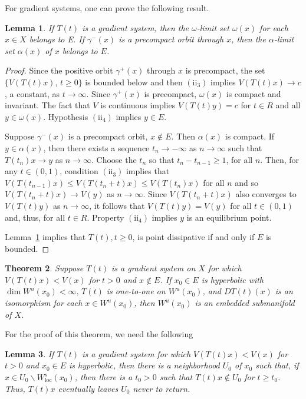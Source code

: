 \documentclass{surv-l}
\theoremstyle{plain}
\newtheorem{theorem}{Theorem}[section]
\newtheorem{lemma}[theorem]{Lemma}
\theoremstyle{definition}
\numberwithin{equation}{section}
\numberwithin{figure}{chapter}
\begin{document}
For gradient systems, one can prove the following result.

\begin{lemma}\label{lem3.8.2} If $T(t)$ is a gradient system, then the $\omega$-limit set $\omega(x)$ for each $x\in X$ belongs to E. If $\gamma^{-}(x)$ is a precompact orbit through $x$, then the $\alpha$-limit set $\alpha(x)$ of $x$ belongs to $E$.
\end{lemma}

\begin{proof} Since the positive orbit $\gamma^{+}(x)$ through $x$ is precompact, the set $\{V(T(t)x)$, $t\geq 0\}$ is bounded below and then $(\mathrm{ii}_{3})$ implies $V(T(t)x)\rightarrow c$, a constant, as $ t\rightarrow\infty$. Since $\gamma^{+}(x)$ is precompact, $\omega(x)$ is compact and invariant. The fact that $V$ is continuous implies $V(T(t)y)=c$ for $t\in R$ and all $y\in\omega(x)$. Hypothesis $(\mathrm{ii}_{4})$ implies $y\in E$.

Suppose $\gamma^{-}(x)$ is a precompact orbit, $x\not\in E$. Then $\alpha(x)$ is compact. If $y\in\alpha(x)$, then there exists a sequence $ t_{n}\rightarrow-\infty$ as $ n\rightarrow\infty$ such that $T(t_{n})x\rightarrow y$ as $ n\rightarrow\infty$. Choose the $t_{n}$ so that $t_{n}-t_{n-1}\geq 1$, for all $n$. Then, for any $t\in(0, 1)$, condition $(\mathrm{ii}_{3})$ implies that $V(T(t_{n-1})x)\leq V(T(t_{n}+t)x)\leq V(T(t_{n})x)$ for all $n$ and so $V(T(t_{n}+t)x)\rightarrow V(y)$ as $ n\rightarrow\infty$. Since $V(T(t_{n}+t)x)$ also converges to $V(T(t)y)$ as $ n\rightarrow\infty$, it follows that $V(T(t)y)=V(y)$ for all $t\in(0,1)$ and, thus, for all $t\in R$. Property $(\mathrm{ii}_{4})$ implies $y$ is an equilibrium point.

Lemma~\ref{lem3.8.2} implies that $T(t), t\geq 0$, is point dissipative if and only if $E$ is bounded.
\end{proof}

\begin{theorem}\label{thm3.8.3} Suppose $T(t)$ is a gradient system on $X$ for which $V(T(t)x) <V(x)$ for $t>0$ and $x\not\in E$. If $x_{0}\in E$ is hyperbolic with $\dim W^{u}(x_{0})<\infty,\, T(t)$ is one-to-one on $W^{u}(x_{0})$, and $DT(t)(x)$ is an isomorphism for each $x\in W^{u}(x_{0})$, then $W^{u}(x_{0})$ is an embedded submanifold of $X$.
\end{theorem}

For the proof of this theorem, we need the following


\begin{lemma}\label{lem3.8.4} If $T(t)$ is a gradient system for which $V(T(t)x)<V(x)$ for $t>0$ and $x_{0}\in E$ is hyperbolic, then there is a neighborhood $U_{0}$ of $x_{0}$ such that, if $x\in U_{0}\backslash W_{\mathrm{loc}}^{s}(x_{0})$, then there is a $t_{0}>0$ such that $T(t)x\not\in U_{0}$ for $t\geq t_{0}$. Thus, $T(t)x$ eventually leaves $U_{0}$ never to return.
\end{lemma}
\end{document}
